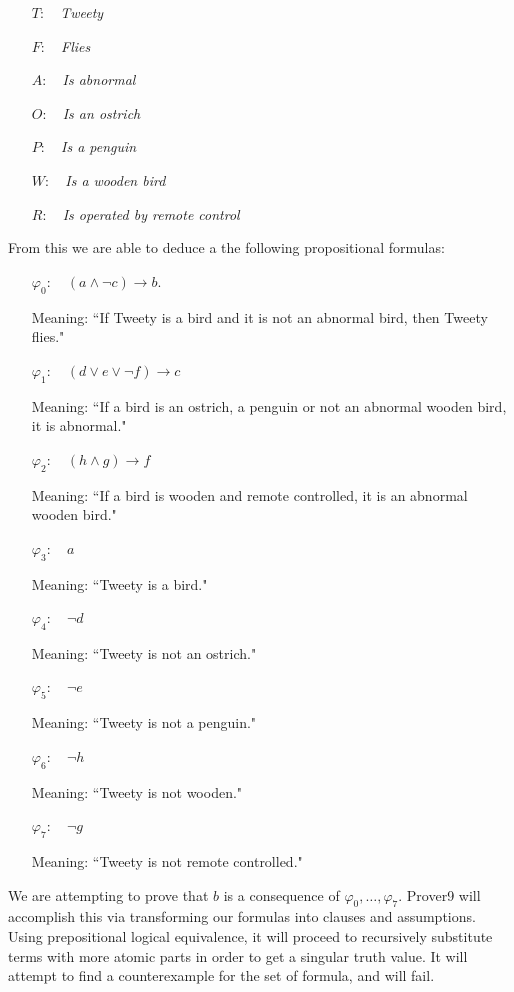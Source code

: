 \documentclass[fullpage]{article}
\begin{document}
\begin{itemize}
\item[$T$:]~ {\em Tweety}
\item[$F$:]~ {\em Flies}
\item[$A$:]~ {\em Is abnormal}
\item[$O$:]~ {\em Is an ostrich}
\item[$P$:]~ {\em Is a penguin}
\item[$W$:]~ {\em Is a wooden bird}
\item[$R$:]~ {\em Is operated by remote control}
\end{itemize}
From this we are able to deduce a the following propositional formulas:
\begin{itemize}
\item[$\varphi_0$:]~ ${(a \wedge \neg c) \rightarrow b}$.

 Meaning: ``If Tweety is a bird and it is not an abnormal bird, then Tweety flies."
\item[$\varphi_1$:]~ ${(d \lor e \lor \neg f) \rightarrow c}$

     Meaning: ``If a bird is an ostrich, a penguin or not an abnormal wooden bird, it is abnormal."
\item[$\varphi_2$:]~ ${(h \wedge g) \rightarrow f}$

 Meaning: ``If a bird is wooden and remote controlled, it is an abnormal wooden bird."
\item[$\varphi_3$:]~ ${a}$

 Meaning: ``Tweety is a bird."
\item[$\varphi_4$:]~ ${\neg d}$

 Meaning: ``Tweety is not an ostrich."
\item[$\varphi_5$:]~ ${\neg e}$

 Meaning: ``Tweety is not a penguin."
\item[$\varphi_6$:]~ ${\neg h}$

 Meaning: ``Tweety is not wooden."
\item[$\varphi_7$:]~ ${\neg g}$

 Meaning: ``Tweety is not remote controlled."
\end{itemize}
We are attempting to prove that $b$ is a consequence of $\varphi_0, \ldots, \varphi_7$. Prover9 will accomplish this via transforming our formulas into clauses and assumptions. Using prepositional logical equivalence, it will proceed to recursively substitute terms with more atomic parts in order to get a singular truth value. It will attempt to find a counterexample for the set of formula, and will fail.
\end{document}
